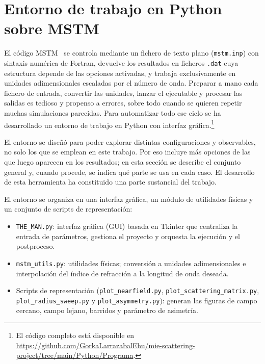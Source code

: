 \section{Entorno de trabajo en Python sobre MSTM}
\label{sec:python_wrapper}

El código MSTM~\cite{Mackowski_code} se controla mediante un fichero
de texto plano (\texttt{mstm.inp}) con sintaxis numérica de Fortran,
devuelve los resultados en ficheros \texttt{.dat} cuya estructura
depende de las opciones activadas, y trabaja exclusivamente en unidades
adimensionales escaladas por el número de onda. Preparar a mano cada
fichero de entrada, convertir las unidades, lanzar el ejecutable y
procesar las salidas es tedioso y propenso a errores, sobre todo cuando
se quieren repetir muchas simulaciones parecidas. Para automatizar todo
ese ciclo se ha desarrollado un entorno de trabajo en Python con
interfaz gráfica.\footnote{El código completo está disponible en
\url{https://github.com/GorkaLarrazabalEhu/mie-scattering-project/tree/main/Python/Programa}.}

El entorno se diseñó para poder explorar distintas configuraciones y
observables, no solo los que se emplean en este trabajo. Por eso
incluye más opciones de las que luego aparecen en los resultados; en
esta sección se describe el conjunto general y, cuando procede, se
indica qué parte se usa en cada caso. El desarrollo de esta herramienta
ha constituido una parte sustancial del trabajo.

El entorno se organiza en una interfaz gráfica, un módulo de utilidades
físicas y un conjunto de scripts de representación:

\begin{itemize}
    \item \texttt{THE\_MAN.py}: interfaz gráfica (GUI) basada en
          Tkinter que centraliza la entrada de parámetros, gestiona el
          proyecto y orquesta la ejecución y el postproceso.
    \item \texttt{mstm\_utils.py}: utilidades físicas; conversión a
          unidades adimensionales e interpolación del índice de
          refracción a la longitud de onda deseada.
    \item Scripts de representación (\texttt{plot\_nearfield.py},
          \texttt{plot\_scattering\_matrix.py},
          \texttt{plot\_radius\_sweep.py} y
          \texttt{plot\_asymmetry.py}): generan las figuras de campo
          cercano, campo lejano, barridos y parámetro de asimetría.
\end{itemize}


